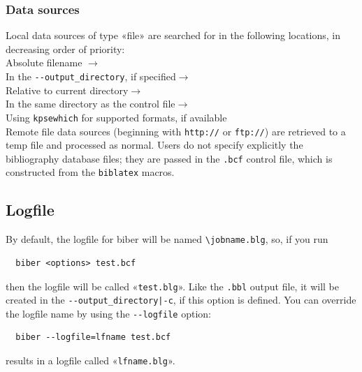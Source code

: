 \documentclass{ltxdockit}
\begin{document}
\subsubsection{Data sources}

Local data sources of type «file» are searched for in the following
locations, in decreasing order of priority:\\[2ex]

\noindent Absolute filename $\rightarrow$\\
\hspace*{1em}In the \verb+--output_directory+, if specified$\rightarrow$\\
\hspace*{2em}Relative to current directory$\rightarrow$\\
\hspace*{3em}In the same directory as the control file$\rightarrow$\\
\hspace*{4em}Using \verb+kpsewhich+ for supported formats, if available\\[2ex]

\noindent Remote file data sources (beginning with \verb+http://+ or
\verb+ftp://+) are retrieved to a temp file and processed as normal. Users
do not specify explicitly the bibliography database files; they are passed
in the \verb+.bcf+ control file, which is constructed from the
\verb+biblatex+ \verb++ macros.

\subsection{Logfile}

By default, the logfile for biber will be named \verb+\jobname.blg+,
so, if you run

\begin{verbatim}
  biber <options> test.bcf
\end{verbatim}

\noindent then the logfile will be called «\verb+test.blg+». Like the
\verb+.bbl+ output file, it will be created in the
\verb+--output_directory|-c+, if this option is defined. You can
override the logfile name by using the \verb+--logfile+ option:

\begin{verbatim}
  biber --logfile=lfname test.bcf
\end{verbatim}

\noindent results in a logfile called «\verb+lfname.blg+».\\
\end{document}
